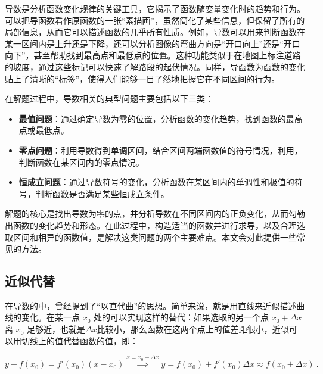 
\begin{issues}
\issueDraft
\end{issues}


导数是分析函数变化规律的关键工具，它揭示了函数随变量变化时的趋势和行为。可以把导函数看作原函数的一张“素描画”，虽然简化了某些信息，但保留了所有的局部信息，从而它可以描述函数的几乎所有性质。例如，导数可以用来判断函数在某一区间内是上升还是下降，还可以分析图像的弯曲方向是“开口向上”还是“开口向下”，甚至帮助找到最高点和最低点的位置。这种功能类似于在地图上标注道路的坡度，通过这些标记可以快速了解路段的起伏情况。同样，导函数为函数的变化贴上了清晰的“标签”，使得人们能够一目了然地把握它在不同区间的行为。

在解题过程中，导数相关的典型问题主要包括以下三类：

\begin{itemize}
\item \textbf{最值问题}：通过确定导数为零的位置，分析函数的变化趋势，找到函数的最高点或最低点。
\item \textbf{零点问题}：利用导数得到单调区间，结合区间两端函数值的符号情况，利用，判断函数在某区间内的零点情况。
\item \textbf{恒成立问题}：通过导数符号的变化，分析函数在某区间内的单调性和极值的符号，判断函数是否满足某些恒成立条件。
\end{itemize}

解题的核心是找出导数为零的点，并分析导数在不同区间内的正负变化，从而勾勒出函数的变化趋势和形态。在此过程中，构造适当的函数并进行求导，以及合理选取区间和相异的函数值，是解决这类问题的两个主要难点。本文会对此提供一些常见的方法。

\subsection{近似代替}

在导数的中，曾经提到了“以直代曲”的思想。简单来说，就是用直线来近似描述曲线的变化。在某一点 $x_0$  处的可以实现这样的替代：如果选取的另一个点  $x_0 + \Delta x$  离  $x_0$  足够近，也就是$\Delta x$比较小，那么函数在这两个点上的值差距很小，近似可以用切线上的值代替函数的值，即：

\begin{equation}\label{eq_HsDerC_1}
y-f(x_0)=f'(x_0)(x-x_0)\overset{x=x_0+\Delta x}{\implies} y=f(x_0)+f'(x_0)\Delta x\approx f(x_0+\Delta x) ~.
\end{equation}

